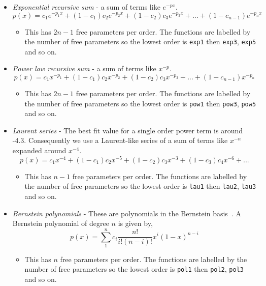 \begin{itemize}
  \item \textit{Exponential recursive sum} - a sum of terms like $e^{-px}$.
    \begin{equation}
      p(x) = c_{1}e^{-p_{1}x} + (1-c_{1})c_{2}e^{-p_{2}x} + (1-c_{2})c_{3}e^{-p_{3}x} + ... + (1-c_{n-1})e^{-p_{n}x}
    \end{equation}
    \begin{itemize}
      \item This has $2n-1$ free parameters per order. The functions are labelled by the number of free parameters so the lowest order is \texttt{exp1} then \texttt{exp3}, \texttt{exp5} and so on.
    \end{itemize}

  \item \textit{Power law recursive sum} - a sum of terms like $x^{-p}$.
    \begin{equation}
      p(x) = c_{1}x^{-p_{1}} + (1-c_{1})c_{2}x^{-p_{2}} + (1-c_{2})c_{3}x^{-p_{3}} + ... + (1-c_{n-1})x^{-p_{n}}
    \end{equation}
    \begin{itemize}
      \item This has $2n-1$ free parameters per order. The functions are labelled by the number of free parameters so the lowest order is \texttt{pow1} then \texttt{pow3}, \texttt{pow5} and so on.
    \end{itemize}

  \item \textit{Laurent series} - The best fit value for a single order power term is around -4.3. Consequently we use a Laurent-like series of a sum of terms like $x^{-n}$ expanded around $x^{-4}$.
    \begin{equation}
      p(x) = c_{1}x^{-4} + (1-c_{1})c_{2}x^{-5} + (1-c_{2})c_{3}x^{-3} + (1-c_{3})c_{4}x^{-6} + ...
    \end{equation}
    \begin{itemize}
      \item This has $n-1$ free parameters per order. The functions are labelled by the number of free parameters so the lowest order is \texttt{lau1} then \texttt{lau2}, \texttt{lau3} and so on.
    \end{itemize}

  \item \textit{Bernstein polynomials} - These are polynomials in the Bernstein basis~\cite{bernsteins1,bernsteins2}. A Bernstein polynomial of degree $n$ is given by,
  \begin{equation}
    p(x) = \displaystyle\sum_{1}^{n}c_{i}\frac{n!}{i!(n-i)!}x^{i}(1-x)^{n-i}
    \label{eq:bernsteins}
  \end{equation}
  \begin{itemize}
    \item This has $n$ free parameters per order. The functions are labelled by the number of free parameters so the lowest order is \texttt{pol1} then \texttt{pol2}, \texttt{pol3} and so on.
  \end{itemize}
\end{itemize}

